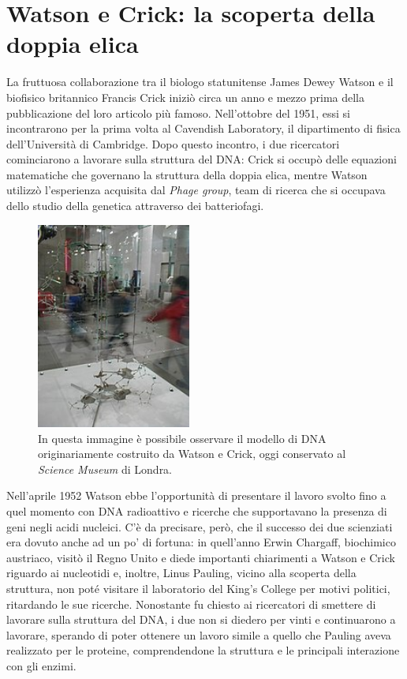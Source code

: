 \documentclass[11pt]{report}
\begin{document}
	 \section{Watson e Crick: la scoperta della doppia elica}
	 
	La fruttuosa collaborazione tra il biologo statunitense James Dewey Watson e il biofisico britannico Francis Crick iniziò circa un anno e mezzo prima della pubblicazione del loro articolo più famoso. Nell'ottobre del 1951, essi si incontrarono per la prima volta al Cavendish Laboratory, il dipartimento di fisica dell'Università di Cambridge. Dopo questo incontro, i due ricercatori cominciarono a lavorare sulla struttura del DNA: Crick si occupò delle equazioni matematiche che governano la struttura della doppia elica, mentre Watson utilizzò l'esperienza acquisita dal \textit{Phage group}, team di ricerca che si occupava dello studio della genetica attraverso dei batteriofagi. 
	\begin{figure}
		\includegraphics[width=2in]{modelloDNA.jpg}
		\caption{{\small In questa immagine è possibile osservare il modello di DNA originariamente costruito da Watson e Crick, oggi conservato al \textit{Science Museum} di Londra.}}
	\end{figure}
	Nell'aprile 1952 Watson ebbe l'opportunità di presentare il lavoro svolto fino a quel momento con DNA radioattivo e ricerche che supportavano la presenza di geni negli acidi nucleici. C'è da precisare, però, che il successo dei due scienziati era dovuto anche ad un po' di fortuna: in quell'anno Erwin Chargaff, biochimico austriaco, visitò il Regno Unito e diede importanti chiarimenti a Watson e Crick riguardo ai nucleotidi e, inoltre, Linus Pauling, vicino alla scoperta della struttura, non poté visitare il laboratorio del King's College per motivi politici, ritardando le sue ricerche. Nonostante fu chiesto ai ricercatori di smettere di lavorare sulla struttura del DNA, i due non si diedero per vinti e continuarono a lavorare, sperando di poter ottenere un lavoro simile a quello che Pauling aveva realizzato per le proteine, comprendendone la struttura e le principali interazione con gli enzimi. 
\end{document}
